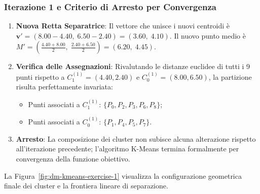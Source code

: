 \FloatBarrier
\subsubsection{Iterazione 1 e Criterio di Arresto per Convergenza}
\begin{enumerate}[label=\textbf{\arabic*.}]
    \item \textbf{Nuova Retta Separatrice}:
    Il vettore che unisce i nuovi centroidi è $\mathbf{v}' = (8.00 - 4.40, \; 6.50 - 2.40) = (3.60, \; 4.10)$.
    Il nuovo punto medio è $M' = \left(\frac{4.40 + 8.00}{2}, \; \frac{2.40 + 6.50}{2}\right) = (6.20, \; 4.45)$.
    \item \textbf{Verifica delle Assegnazioni}:
    Rivalutando le distanze euclidee di tutti i 9 punti rispetto a $C_1^{(1)} = (4.40, 2.40)$ e $C_0^{(1)} = (8.00, 6.50)$, la partizione risulta perfettamente invariata:
    \begin{itemize}
        \item Punti associati a $C_1^{(1)}$: $\{P_0, P_2, P_3, P_6, P_8\}$;
        \item Punti associati a $C_0^{(1)}$: $\{P_1, P_4, P_5, P_7\}$.
    \end{itemize}
    \item \textbf{Arresto}: La composizione dei cluster non subisce alcuna alterazione rispetto all'iterazione precedente; l'algoritmo K-Means termina formalmente per convergenza della funzione obiettivo.
\end{enumerate}

La Figura~\ref{fig:dm-kmeans-exercise-1} visualizza la configurazione geometrica finale dei cluster e la frontiera lineare di separazione.

